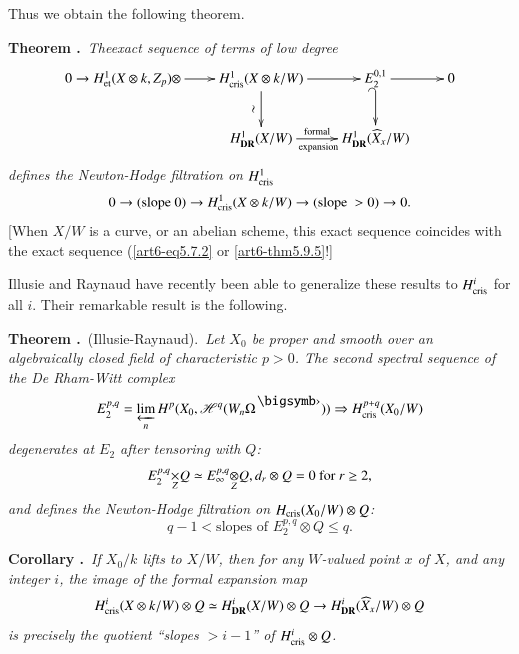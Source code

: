 Thus we obtain the following theorem.

\medskip
\noindent
{\bf Theorem .\label{art6-thm8.4}}~{\em The\pageoriginale exact sequence of terms of low degree}
\[
\xymatrix@C=.75cm{
0\to H^{1}_{\et}(X\otimes k,Z_{p})\otimes \ar[r] & H^{1}_{\cris}(X\otimes k/W)\ar[d]_{\rotatebox{90}{$\sim$}}\ar[r] & E^{0,1}_{2}\ar[r]\ar@{_(->}[d] & 0\\
 & H^{1}_{\DR}(X/W)\ar[r]^-{\text{formal}}_{\text{expansion}} & H^{1}_{\DR}(\widehat{X}_{x}/W) & 
}
\]
{\em defines the Newton-Hodge filtration on $H^{1}_{\operatorname{cris}}$}
$$
0\to (\text{slope~}0)\to H^{1}_{\operatorname{cris}}(X\otimes k/W)\to (\text{slope~}>0)\to 0.
$$
[When $X/W$ is a curve, or an abelian scheme, this exact sequence coincides with the exact sequence (\eqref{art6-eq5.7.2} or \eqref{art6-thm5.9.5}!]

Illusie and Raynaud have recently been able to generalize these results to $H^{i}_{\operatorname{cris}}$ for all $i$. Their remarkable result is the following.

\medskip
\noindent
{\bf Theorem .\label{art6-thm8.5}}~(Illusie-Raynaud).~{\em Let $X_{0}$ be proper and smooth over an algebraically closed field of characteristic $p>0$. The second spectral sequence of the De Rham-Witt complex}
$$
E^{p,q}_{2}=\varprojlim\limits_{n}H^{p}(X_{0},\mathscr{H}^{q}(W_{n}\Omega^{\bigdot}))\Rightarrow H^{p+q}_{\cris}(X_{0}/W)
$$
{\em degenerates at $E_{2}$ after tensoring with $Q$:}
$$
\fprod{E^{p,q}_{2}}{Q}{Z}\simeq \foprod{E^{p,q}_{\infty}}{Q}{Z}, d_{r}\otimes Q=0\text{~~ for~~ } r\geq 2,
$$
{\em and defines the Newton-Hodge filtration on $H_{\operatorname{cris}}(X_{0}/W)\otimes Q$:}
$$
q-1<\text{slopes of~}E^{p,q}_{2}\otimes Q\leq q.
$$

\smallskip
\noindent
{\bf Corollary .\label{art6-coro8.6}}~{\em If $X_{0}/k$ lifts to $X/W$, then for any $W$-valued point $x$ of $X$, and any integer $i$, the image of the formal expansion map}
$$
H^{i}_{\operatorname{cris}}(X\otimes k/W)\otimes Q\simeq H^{i}_{\mathbf{DR}}(X/W)\otimes Q\to H^{i}_{\mathbf{DR}}(\widehat{X}_{x}/W)\otimes Q
$$
{\em is precisely the quotient ``slopes $>i-1$'' of $H^{i}_{\operatorname{cris}}\otimes Q$.}

